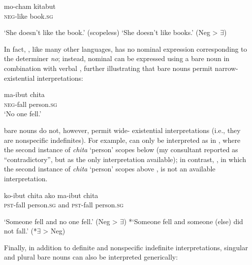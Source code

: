\documentclass[output=paper,newtxmath,modfonts,nonflat,hidelinks]{langsci/langscibook}
\begin{document}
\begin{exe}
\ex \label{ex:landman:barenounambig}
  \gll mo-cham kitabut\\	
       \textsc{neg}-like book.\textsc{sg}\\
  \begin{xlist}
  \ex \label{ex:landman:scopeless} ‘She doesn't like the book.’  (scopeless)
  \ex \label{ex:landman:negexis} ‘She doesn't like books.’ (Neg > $\exists$)
  \end{xlist}   
\end{exe}

 In fact, , like many other languages, has no nominal expression corresponding to the  determiner \textit{no}; instead, nominal  can be expressed using a bare noun in combination with verbal , further illustrating that bare nouns permit narrow- existential interpretations:

\ea \label{ex:landman:negbarenoun}
  \gll ma-ibut chita\\	
	   \textsc{neg}-fall person.\textsc{sg}\\
\glt ‘No one fell.’
\z 

 bare nouns do not, however, permit wide- existential interpretations (i.e., they are nonspecific indefinites). For example,  can only be interpreted as in , where the second instance of \textit{chita} ‘person’ scopes below  (my consultant reported  as \textquotedblleft contradictory\textquotedblright, but as the only interpretation available); in contrast, , in which the second instance of \textit{chita} ‘person’ scopes above , is not an available interpretation.

\begin{exe}
\ex \label{ex:landman:scopesg}
  \gll ko-ibut chita ako ma-ibut chita\\	
	   \textsc{pst}-fall person.\textsc{sg} and \textsc{pst}-fall person.\textsc{sg}\\
  \begin{xlist}
  \ex \label{ex:landman:narrow}‘Someone fell and no one fell.’ (Neg > $\exists$)
  \ex \label{ex:landman:wide} *‘Someone fell and someone (else) did not fall.’ (*$\exists$ > Neg)
  \end{xlist}   
\end{exe}

Finally, in addition to definite and nonspecific indefinite interpretations, singular and plural bare nouns can also be interpreted generically:
\end{document}
